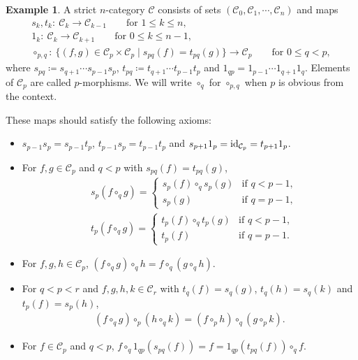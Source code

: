 \documentclass[pdftex]{sigma}
\numberwithin{equation}{section}
\theoremstyle{definition}
\newtheorem{Example}[Theorem]{Example}
\begin{document}
\begin{Example}\label{ex:polygon from n-groupid}
 A strict $n$-category $\mathcal{C}$ consists of sets $(\mathcal{C}_0,\mathcal{C}_1,\cdots,\mathcal{C}_n)$ and maps
 \begin{gather*}
 s_k, t_k \colon \ \mathcal{C}_k \to \mathcal{C}_{k-1} \qquad \text{for } 1 \leq k \leq n ,\\
 1_k \colon \ \mathcal{C}_k \to \mathcal{C}_{k+1} \qquad \text{for } 0 \leq k \leq n-1 ,
\\
 \circ_{p,q} \colon \ \{(f,g)\in \mathcal{C}_p \times \mathcal{C}_p\mid s_{pq}(f)=t_{pq}(g)\} \to \mathcal{C}_p \qquad \text{for } 0 \leq q < p,
 \end{gather*}
 where $s_{pq} \coloneqq s_{q+1}\cdots s_{p-1}s_p$, $t_{pq} \coloneqq t_{q+1}\cdots t_{p-1}t_p$ and $1_{qp}=1_{p-1}\cdots 1_{q+1}1_{q}$.
 Elements of $\mathcal{C}_p$ are called $p$-morphisms.
 We will write $\circ_q$ for $\circ_{p,q}$ when $p$ is obvious from the context.

 These maps should satisfy the following axioms:
 \begin{itemize}\itemsep=0pt
 \item $s_{p-1}s_{p}=s_{p-1}t_p$, $t_{p-1}s_p=t_{p-1}t_p$ and $s_{p+1}1_p={\rm id}_{\mathcal{C}_p}=t_{p+1}1_p$.
 \item For $f,g\in \mathcal{C}_p$ and $q<p$ with $s_{pq}(f)=t_{pq}(g)$,
 \begin{align*}
 & s_{p}(f\circ_q g)=
 \begin{cases}
 s_p(f)\circ_q s_p(g) &\text{if $q<p-1$,} \\
 s_p(g) &\text{if $q=p-1$,}
 \end{cases} \\
 & t_{p}(f\circ_q g)=
 \begin{cases}
 t_p(f)\circ_q t_p(g) &\text{if $q<p-1$,} \\
 t_p(f) &\text{if $q=p-1$.}
 \end{cases}
 \end{align*}
 \item For $f, g ,h\in \mathcal{C}_p$, $(f\circ_q g)\circ_q h=f\circ_q (g\circ_q h)$.
 \item For $q<p<r$ and $f, g, h, k\in\mathcal{C}_r$ with $t_q(f)=s_q(g)$, $t_q(h)=s_q(k)$ and $t_p(f)=s_p(h)$,
 \begin{align*}
 (f\circ_q g)\circ_p (h\circ_q k)=(f\circ_p h)\circ_q(g\circ_p k).
 \end{align*}
 \item For $f\in\mathcal{C}_p$ and $q<p$, $f\circ_q 1_{qp}(s_{pq}(f))=f=1_{qp}(t_{pq}(f))\circ_q f$.
 \end{itemize}


\end{Example}
\end{document}
